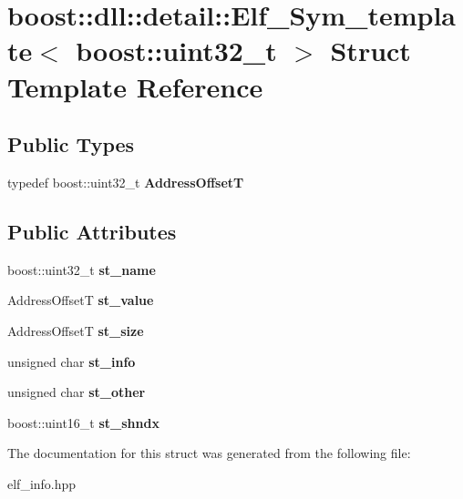 \hypertarget{a00089}{}\section{boost\+:\+:dll\+:\+:detail\+:\+:Elf\+\_\+\+Sym\+\_\+template$<$ boost\+:\+:uint32\+\_\+t $>$ Struct Template Reference}
\label{a00089}
\subsection*{Public Types}
\begin{DoxyCompactItemize}
\item 
typedef boost\+::uint32\+\_\+t {\bfseries Address\+OffsetT}\hypertarget{a00089_a5d357c24b88c12797825ae9aac2ad518}{}\label{a00089_a5d357c24b88c12797825ae9aac2ad518}

\end{DoxyCompactItemize}
\subsection*{Public Attributes}
\begin{DoxyCompactItemize}
\item 
boost\+::uint32\+\_\+t {\bfseries st\+\_\+name}\hypertarget{a00089_a5f05cce584bc27a780fe9d1526c819c3}{}\label{a00089_a5f05cce584bc27a780fe9d1526c819c3}

\item 
Address\+OffsetT {\bfseries st\+\_\+value}\hypertarget{a00089_a22d87bb002a00dfaf68e38618b08e972}{}\label{a00089_a22d87bb002a00dfaf68e38618b08e972}

\item 
Address\+OffsetT {\bfseries st\+\_\+size}\hypertarget{a00089_a8ad90ebe03f73b3d89493d5d454fffdf}{}\label{a00089_a8ad90ebe03f73b3d89493d5d454fffdf}

\item 
unsigned char {\bfseries st\+\_\+info}\hypertarget{a00089_a4c025e263be3687bc20e584ec187786c}{}\label{a00089_a4c025e263be3687bc20e584ec187786c}

\item 
unsigned char {\bfseries st\+\_\+other}\hypertarget{a00089_ac583a35bd53e3e45c0da77d2b7de504f}{}\label{a00089_ac583a35bd53e3e45c0da77d2b7de504f}

\item 
boost\+::uint16\+\_\+t {\bfseries st\+\_\+shndx}\hypertarget{a00089_ac782cc2b5aac3204a6553d3534e112dd}{}\label{a00089_ac782cc2b5aac3204a6553d3534e112dd}

\end{DoxyCompactItemize}


The documentation for this struct was generated from the following file\+:\begin{DoxyCompactItemize}
\item 
elf\+\_\+info.\+hpp\end{DoxyCompactItemize}
